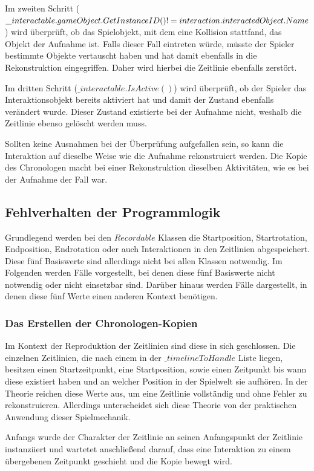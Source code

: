 Im zweiten Schritt ($\_interactable.gameObject.GetInstanceID() \\!= interaction.interactedObject.Name$) wird überprüft, ob das Spielobjekt, mit dem eine Kollision stattfand, das Objekt der Aufnahme ist. Falls dieser Fall eintreten würde, müsste der Spieler bestimmte Objekte vertauscht haben und hat damit ebenfalls in die Rekonstruktion eingegriffen. Daher wird hierbei die Zeitlinie ebenfalls zerstört.

Im dritten Schritt ($\_interactable.IsActive()$) wird überprüft, ob der Spieler das Interaktionsobjekt bereits aktiviert hat und damit der Zustand ebenfalls verändert wurde. Dieser Zustand existierte bei der Aufnahme nicht, weshalb die Zeitlinie ebenso gelöscht werden muss.

Sollten keine Ausnahmen bei der Überprüfung aufgefallen sein, so kann die Interaktion auf dieselbe Weise wie die Aufnahme rekonstruiert werden. Die Kopie des Chronologen macht bei einer Rekonstruktion dieselben Aktivitäten, wie es bei der Aufnahme der Fall war.

\subsection{Fehlverhalten der Programmlogik}\label{sec:recordable-specifications}
Grundlegend werden bei den $Recordable$ Klassen die Startposition, Startrotation, Endposition, Endrotation oder auch Interaktionen in den Zeitlinien abgespeichert. Diese fünf Basiswerte sind allerdings nicht bei allen Klassen notwendig. Im Folgenden werden Fälle vorgestellt, bei denen diese fünf Basiswerte nicht notwendig oder nicht einsetzbar sind. Darüber hinaus werden Fälle dargestellt, in denen diese fünf Werte einen anderen Kontext benötigen.
\subsubsection{Das Erstellen der Chronologen-Kopien}
Im Kontext der Reproduktion der Zeitlinien sind diese in sich geschlossen. Die einzelnen Zeitlinien, die nach einem  in der $\_timelineToHandle$ Liste liegen, besitzen einen Startzeitpunkt, eine Startposition, sowie einen Zeitpunkt bis wann diese existiert haben und an welcher Position in der Spielwelt sie aufhören. In der Theorie reichen diese Werte aus, um eine Zeitlinie vollständig und ohne Fehler zu rekonstruieren. Allerdings unterscheidet sich diese Theorie von der praktischen Anwendung dieser Spielmechanik. 

Anfangs wurde der Charakter der Zeitlinie an seinen Anfangspunkt der Zeitlinie instanziiert und wartetet anschließend darauf, dass eine Interaktion zu einem übergebenen Zeitpunkt geschieht und die Kopie bewegt wird.

